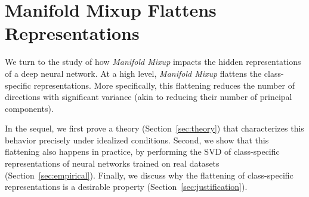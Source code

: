 \documentclass{article} \usepackage[preprint]{nips_2018}
\newcommand{\manifoldmixup}{\textit{Manifold Mixup}}
\begin{document}
\begin{figure*}
\begin{subfigure}[b]{0.33\textwidth}
        \centering
    \end{subfigure}
    \caption{Illustration on why Manifold Mixup learns flatter representations. The interpolation between A1 and B2 in the left panel soft-labels the black dot as 50\% red and 50\% blue, regardless of being very close to a blue point.  
In the middle panel a different interpolation between A2 and B1 soft-labels the same point as ~95\% blue and ~5\% red.  
However, since \emph{Manifold Mixup} \emph{learns} the hidden representations,
    the pressure to predict consistent soft-labels at interpolated points causes the states to become flattened (right panel).}
    \label{fig:intuitive}
\end{figure*}



\section{Manifold Mixup Flattens Representations}
\label{sec:flatten}

We turn to the study of how \manifoldmixup{} impacts the hidden representations of a deep neural network.
At a high level, \manifoldmixup{} flattens the class-specific representations.
More specifically, this flattening reduces the number of directions with significant variance (akin to reducing their number of principal components).

In the sequel, we first prove a theory (Section~\ref{sec:theory}) that characterizes this behavior precisely under idealized conditions. 
Second, we show that this flattening also happens in practice, by performing the SVD of class-specific representations of neural networks trained on real datasets (Section~\ref{sec:empirical}).
Finally, we discuss why the flattening of class-specific representations is a desirable property (Section~\ref{sec:justification}).
\end{document}
